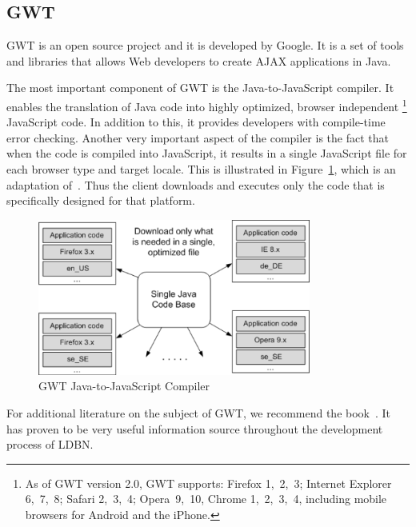 \subsection{GWT}
\label{sec:gwt}

GWT is an open source project
and it is developed by Google. It is a set of tools and libraries that allows Web developers to
create AJAX applications in Java. 

The most important component of GWT is the Java-to-JavaScript compiler. It enables the
translation of Java code into highly optimized, browser independent
\footnote{As of GWT version 2.0, GWT supports: 
Firefox 1,~2,~3; Internet Explorer 6,~7,~8; Safari 2,~3,~4; Opera~9,~10, Chrome 1,~2,~3,~4, including mobile browsers for Android and the iPhone.} 
JavaScript code.
In addition to this, it provides developers with compile-time error checking. Another
very important aspect of the compiler is the fact that when the code is compiled into
JavaScript, it results in a single JavaScript file for each browser type and target locale.
This is illustrated in Figure~\ref{fig:gwt01}, which is an adaptation of~\cite[Figure 7]{wgio2}. 
Thus the client downloads and executes only the code that is specifically designed for that platform.  

\begin{figure}[h]
	\begin{center}
		\includegraphics[width=0.8\textwidth]{./img/gwt01a.png}
		\caption{GWT Java-to-JavaScript Compiler}
		\label{fig:gwt01}
	\end{center}
\end{figure}

For additional literature on the subject of GWT, we recommend the book~\cite{bgwt2}. 
It has
proven to be very useful information source throughout the development process 
of LDBN. 

